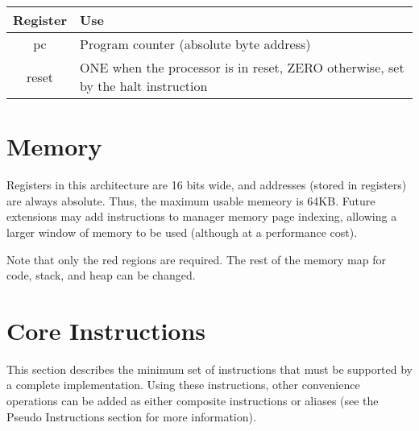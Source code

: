 \documentclass{article}
\begin{document}
\begin{tabular}{|cp{10cm}|}
  \hline
  Register & Use \\
  \hline
  pc & Program counter (absolute byte address) \\
  reset & ONE when the processor is in reset, ZERO otherwise, set by the halt instruction \\
  \hline
\end{tabular}


\section{Memory}
Registers in this architecture are 16 bits wide, and addresses (stored in registers) are always
absolute. Thus, the maximum usable memeory is 64KB. Future extensions may add instructions
to manager memory page indexing, allowing a larger window of memory to be used (although at a
performance cost).

Note that only the red regions are required. The rest of the memory map for code, stack, and heap
can be changed.



\section{Core Instructions}
This section describes the minimum set of instructions that must be supported by a complete
implementation. Using these instructions, other convenience operations can be added as either
composite instructions or aliases (see the Pseudo Instructions section for more information).
\end{document}
